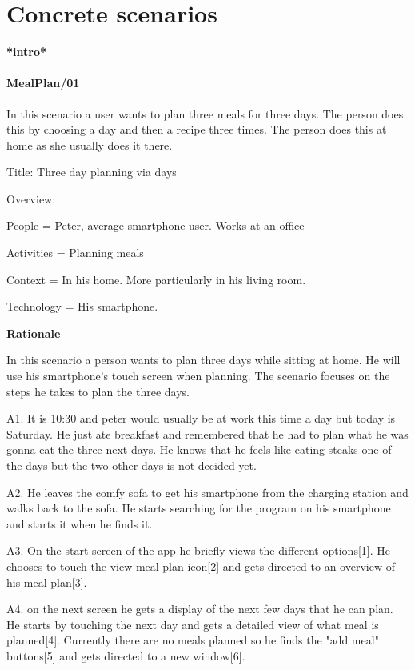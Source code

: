 \section{Concrete scenarios}
\textbf{*intro*}

\paragraph{MealPlan/01}

In this scenario a user wants to plan three meals for three days. The person does this by choosing a day and then a recipe three times. The person does this at home as she usually does it there.

Title: Three day planning via days

Overview: 

	People = Peter, average smartphone user. Works at an office
	
	Activities = Planning meals
	
	Context = In his home. More particularly in his living room.
	
	Technology = His smartphone.
	
\textbf{Rationale}

In this scenario a person wants to plan three days while sitting at home. He will use his smartphone's touch screen when planning. The scenario focuses on the steps he takes to plan the three days.
	
	A1. It is 10:30 and peter would usually be at work this time a day but today is Saturday. He just ate breakfast and remembered that he had to plan what he was gonna eat the three next days. He knows that he feels like eating steaks one of the days but the two other days is not decided yet.
	
	A2. He leaves the comfy sofa to get his smartphone from the charging station and walks back to the sofa. He starts searching for the program on his smartphone and starts it when he finds it.
	
	A3. On the start screen of the app he briefly views the different options[1]. He chooses to touch the view meal plan icon[2] and gets directed to an overview of his meal plan[3]. 
	
	A4. on the next screen he gets a display of the next few days that he can plan. He starts by touching the next day and gets a detailed view of what meal is planned[4]. Currently there are no meals planned so he finds the "add meal" buttons[5] and gets directed to a new window[6]. 
	
